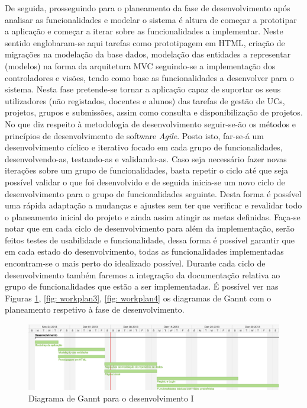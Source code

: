 De seguida, prosseguindo para o planeamento da fase de desenvolvimento após 
analisar as funcionalidades e modelar o sistema  é altura de começar a 
prototipar a aplicação e começar a iterar sobre as funcionalidades a 
implementar. Neste sentido englobaram-se aqui tarefas como prototipagem em HTML, 
criação de migrações na modelação da base dados, modelação das entidades a 
representar (modelos) na forma da arquitetura MVC seguindo-se a implementação dos 
controladores e visões, tendo como base as funcionalidades a desenvolver para o 
sistema. Nesta fase pretende-se tornar a aplicação capaz de suportar os seus 
utilizadores (não registados, docentes e alunos) das tarefas de gestão de UCs, 
projetos, grupos e submissões, assim como consulta e disponibilização de 
projetos. No que diz respeito à metodologia de desenvolvimento seguir-se-ão 
os métodos e princípios de desenvolvimento de software \textit{Agile}. Posto isto, 
far-se-á um desenvolvimento cíclico e iterativo focado em cada grupo de 
funcionalidades, desenvolvendo-as, testando-as e validando-as. Caso seja 
necessário fazer novas iterações sobre um grupo de funcionalidades, basta 
repetir o ciclo até que seja possível validar o que foi desenvolvido e de seguida inicia-se 
um novo ciclo de desenvolvimento para o grupo de funcionalidades seguinte.
Desta forma é possível uma rápida adaptação a mudanças e ajustes sem ter que verificar e 
revalidar todo o planeamento inicial do projeto e ainda assim atingir as metas 
definidas.
Faça-se notar que em cada ciclo de desenvolvimento para além da implementação,
 serão feitos testes de usabilidade e funcionalidade, dessa forma é possível garantir que em cada estado do 
desenvolvimento, todas as funcionalidades implementadas encontram-se o mais perto 
do idealizado possível.
Durante cada ciclo de desenvolvimento também faremos a integração da 
documentação relativa ao grupo de funcionalidades que estão a ser implementadas.
É possível ver nas Figuras \ref{fig: workplan2}, \ref{fig: workplan3}, \ref{fig: workplan4} 
os diagramas de Gannt com o planeamento respetivo à fase de desenvolvimento.

\begin{figure}[htbp!] 
  \centering
  \includegraphics[width=1\textwidth]{images/plano_de_trabalho/gannt_2.png}
  \caption{Diagrama de Gannt para o desenvolvimento I}
  \label{fig: workplan2}
\end{figure}

